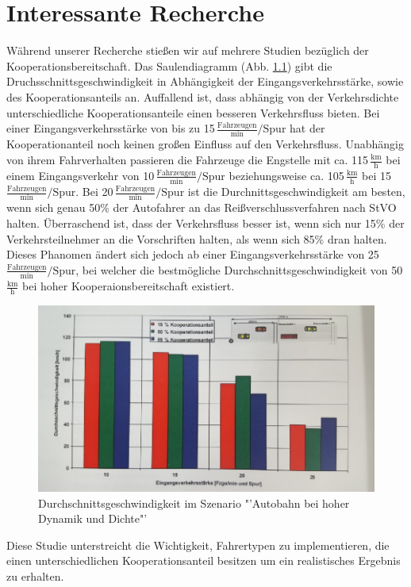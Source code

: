 \chapter{Interessante Recherche}
Während unserer Recherche stießen wir auf mehrere Studien \cite[S.129]{Benmimoun.2004} bezüglich der Kooperationsbereitschaft. Das Saulendiagramm (Abb. \ref{fig:kooperation}) gibt die Druchsschnittsgeschwindigkeit in Abhängigkeit der Eingangsverkehrsstärke, sowie des Kooperationsanteils an. Auffallend ist, dass abhängig von der Verkehrsdichte unterschiedliche Kooperationsanteile einen besseren Verkehrsfluss bieten. Bei einer Eingangsverkehrsstärke von bis zu 15\,$\frac{\text{Fahrzeugen}}{\text{min}}/\text{Spur}$ hat der Kooperationanteil noch keinen großen Einfluss auf den Verkehrsfluss. Unabhängig von ihrem Fahrverhalten passieren die Fahrzeuge die Engstelle mit ca. 115\,$\frac{\text{km}}{\text{h}}$ bei einem Eingangsverkehr von 10\,$\frac{\text{Fahrzeugen}}{\text{min}}/\text{Spur}$ beziehungsweise ca. 105\,$\frac{\text{km}}{\text{h}}$ bei 15\,$\frac{\text{Fahrzeugen}}{\text{min}}/\text{Spur}$.
Bei 20\,$\frac{\text{Fahrzeugen}}{\text{min}}/\text{Spur}$ ist die Durchnittsgeschwindigkeit am besten, wenn sich genau 50\% der Autofahrer an das Reißverschlussverfahren nach StVO halten. Überraschend ist, dass der Verkehrsfluss besser ist, wenn sich nur 15\% der Verkehrsteilnehmer an die Vorschriften halten, als wenn sich 85\% dran halten. Dieses Phanomen ändert sich jedoch ab einer Eingangsverkehrsstärke von 25\,$\frac{\text{Fahrzeugen}}{\text{min}}/\text{Spur}$, bei welcher die bestmögliche Durchschnittsgeschwindigkeit von 50\,$\frac{\text{km}}{\text{h}}$ bei hoher Kooperaionsbereitschaft existiert.\\
\begin{figure}
	\centering
	\includegraphics[width=0.6\linewidth]{images/Kooperation}
	\caption{Durchschnittsgeschwindigkeit im Szenario "'Autobahn bei hoher Dynamik und Dichte"'}
	\label{fig:kooperation}
\end{figure}
Diese Studie unterstreicht die Wichtigkeit, Fahrertypen zu implementieren, die einen unterschiedlichen Kooperationsanteil besitzen um ein realistisches Ergebnis zu erhalten.